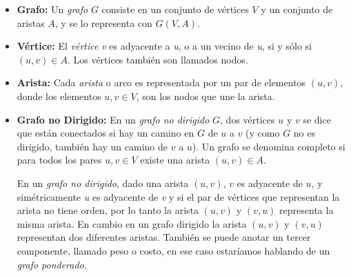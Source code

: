 

      \begin{itemize}
        \item \textbf{Grafo:} Un \emph{grafo} $G$ consiste en un conjunto de vértices $V$ y un conjunto de aristas $A$, y se lo representa con $G(V,A)$.

        \item  \textbf{Vértice:} El \emph{vértice} \emph{v} es adyacente a \emph{u}, o a un vecino de \emph{u}, si y sólo si $(u,v) \in A$. Los vértices también son llamados nodos.

        \item  \textbf{Arista:}
        Cada \emph{arista} o arco es representada por un par de elementos $(u,v)$, donde los elementos $u,v \in V$, son los nodos que une la arista.


        \item \textbf{Grafo no Dirigido:}
        En un \emph{grafo no dirigido} $G$, dos vértices $u$ y $v$ se dice que están conectados si hay un camino en $G$ de $u$ a $v$ (y como $G$ no es dirigido, también hay un camino de $v$ a $u$). Un grafo  se denomina completo si para todos los pares $u,v \in V$ existe una arista $(u,v) \in A$.

        En un \emph{grafo no dirigido}, dado una arista $(u,v)$, $v$ es adyacente de $u$, y simétricamente \emph{u} es adyacente de \emph{v} y si el par de vértices que representan la arista no tiene orden, por lo tanto la arista $(u,v)$ y $(v,u)$ representa la misma arista. En cambio en un grafo dirigido la arista $(u,v)$ y $(v,u)$ representan dos diferentes aristas. También se puede anotar un tercer componente, llamado peso o costo, en ese caso estaríamos hablando de un \emph{grafo ponderado}.

      \end{itemize}



